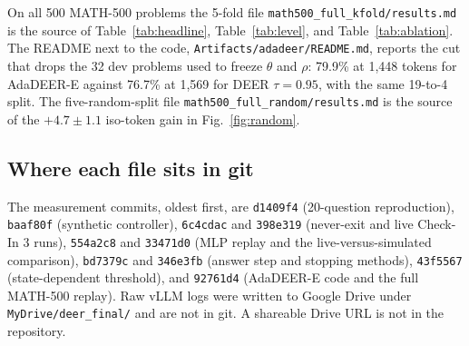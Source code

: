 On all 500 MATH-500 problems the 5-fold file \texttt{math500\_full\_kfold/results.md} is the source of Table~\ref{tab:headline}, Table~\ref{tab:level}, and Table~\ref{tab:ablation}.
The README next to the code, \texttt{Artifacts/adadeer/README.md}, reports the cut that drops the 32 dev problems used to freeze $\theta$ and $\rho$: 79.9\% at 1{,}448 tokens for AdaDEER-E against 76.7\% at 1{,}569 for DEER $\tau=0.95$, with the same 19-to-4 split.
The five-random-split file \texttt{math500\_full\_random/results.md} is the source of the $+4.7\pm 1.1$ iso-token gain in Fig.~\ref{fig:random}.

\subsection{Where each file sits in git}
The measurement commits, oldest first, are \texttt{d1409f4} (20-question reproduction), \texttt{baaf80f} (synthetic controller), \texttt{6c4cdac} and \texttt{398e319} (never-exit and live Check-In 3 runs), \texttt{554a2c8} and \texttt{33471d0} (MLP replay and the live-versus-simulated comparison), \texttt{bd7379c} and \texttt{346e3fb} (answer step and stopping methods), \texttt{43f5567} (state-dependent threshold), and \texttt{92761d4} (AdaDEER-E code and the full MATH-500 replay).
Raw vLLM logs were written to Google Drive under \texttt{MyDrive/deer\_final/} and are not in git.
A shareable Drive URL is not in the repository.
